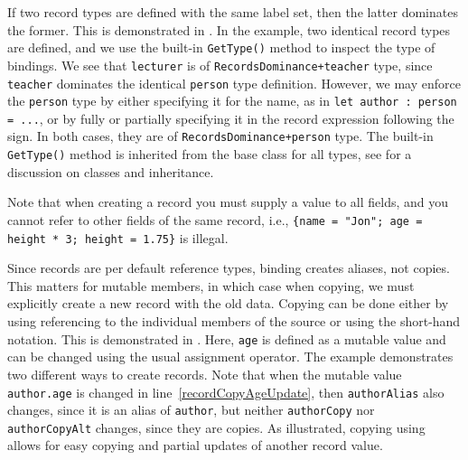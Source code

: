 \documentclass[fsharpNotes.tex]{subfiles}
\begin{document}
If two record types are defined with the same label set, then the latter dominates the former. This is demonstrated in .
%
%
In the example, two identical record types are defined, and we use the built-in \lstinline{GetType()} method to inspect the type of bindings. We see that \lstinline{lecturer} is of \lstinline{RecordsDominance+teacher} type, since \lstinline{teacher} dominates the identical \lstinline{person} type definition. However, we may enforce the \lstinline{person} type by either specifying it for the name, as in \lstinline{let author : person = ...}, or by fully or partially specifying it in the record expression following the \lexeme{=} sign. In both cases, they are of \lstinline{RecordsDominance+person} type. The built-in \lstinline{GetType()} method is inherited from the base class for all types, see  for a discussion on classes and inheritance.

Note that when creating a record you must supply a value to all fields, and you cannot refer to other fields of the same record, i.e., \lstinline!{name = "Jon"; age = height * 3; height = 1.75}! is illegal.

Since records are per default reference types, binding creates aliases, not copies. This matters for mutable members, in which case when copying, we must explicitly create a new record with the old data. Copying can be done either by using referencing to the individual members of the source or using the short-hand  notation. This is demonstrated in .
%
%
Here, \lstinline{age} is defined as a mutable value and can be changed using the usual \lexeme{<-} assignment operator. The example demonstrates two different ways to create records. Note that when the mutable value \lstinline{author.age} is changed in line~\ref{recordCopyAgeUpdate}, then \lstinline{authorAlias} also changes, since it is an alias of \lstinline{author}, but neither \lstinline{authorCopy} nor \lstinline{authorCopyAlt} changes, since they are copies. As illustrated, copying using  allows for easy copying and partial updates of another record value.
\end{document}
